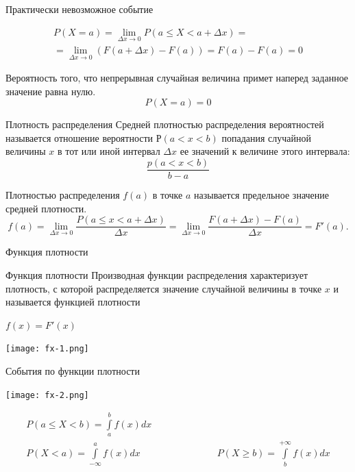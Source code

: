 \documentclass[unicode,11pt,notheorems,xcolor=table]{beamer}
\begin{document}
\begin{frame}{Практически невозможное событие}{}

    \begin{multline*}
        P(X=a) =  \lim_{\Delta x \to 0} P(a \leqslant X < a+\Delta x) 
        =\\
        = \lim_{\Delta x \to 0} (F(a+\Delta x) - F(a)) = F(a)-F(a)=0   
    \end{multline*}
    \begin{block}{}
        Вероятность того, что непрерывная случайная величина примет наперед заданное значение равна нулю.
        $$
        P(X=a)=0
        $$
    \end{block}

    
\end{frame}

\begin{frame}{Плотность распределения}{}
    \alert{Средней плотностью} распределения вероятностей называется отношение вероятности $Р(a<x<b)$  попадания случайной величины $x$ в тот или иной интервал $\Delta x$ ее значений к величине этого интервала: 
    $$
        \frac{p(a <x<b)}{b-a}
    $$
    \begin{block}{}
    Плотностью распределения $f(a)$ в точке $a$ называется предельное значение средней плотности.
    $$
        f(a) = \lim_{\Delta x \to 0} \frac{P(a\leqslant x < a+\Delta x)}{\Delta x} = \lim_{\Delta x \to 0} \frac{F(a+\Delta x)-F(a)}{\Delta x} = F'(a).
    $$
    \end{block}
\end{frame}

\begin{frame}{Функция плотности}{}
    \begin{block}{Функция плотности}
        Производная функции распределения характеризует плотность, с которой распределяется значение случайной величины в точке $x$ и называется \alert{функцией плотности}
        
        {\centering $ f(x) = F'(x) $  \par}
    \end{block}
    
    {\centering
        \texttt{[image: fx-1.png]}    
    \par}
\end{frame}

\begin{frame}{События по функции плотности}{}
    {\centering
        \texttt{[image: fx-2.png]}    
    \par}

    \vspace{-7mm}
    \begin{gather*}
        P(a \leqslant X < b) = \int\limits_a^b f(x)dx\\
        P(X < a) = \int\limits_{-\infty}^a f(x)dx\qquad \qquad\qquad\qquad
        P(X \geqslant b) = \int\limits_b^{+\infty}f(x)dx
    \end{gather*}
\end{frame}
\end{document}
